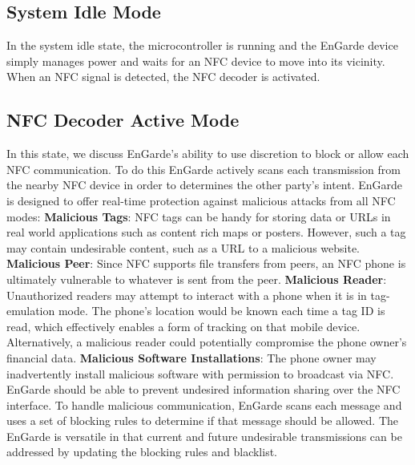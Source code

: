 \documentclass{sig-alternate}
\begin{document}
\subsection{System Idle Mode}
In the system idle state, the microcontroller is running and the EnGarde device simply manages power and waits for an NFC device to move into its vicinity. When an NFC signal is detected, the NFC decoder is activated.

\subsection{NFC Decoder Active Mode}
In this state, we discuss EnGarde's ability to use discretion to block or allow each NFC communication. To do this EnGarde actively scans each transmission from the nearby NFC device in order to determines the other party's intent. EnGarde is designed to offer real-time protection against malicious attacks from all NFC modes:
\vspace{2mm}\newline
\noindent\textbf{Malicious Tags}: NFC tags can be handy for storing data or URLs in real world applications such as content rich maps or posters. However, such a tag may contain undesirable content, such as a URL to a malicious website. 
\vspace{2mm}\newline
\noindent\textbf{Malicious Peer}: Since NFC supports file transfers from peers, an NFC phone is ultimately vulnerable to whatever is sent from the peer.
\vspace{2mm}\newline
\noindent\textbf{Malicious Reader}: Unauthorized readers may attempt to interact with a phone when it is in tag-emulation mode. The phone's location would be known each time a tag ID is read, which effectively enables a form of tracking on that mobile device. Alternatively, a malicious reader could potentially compromise the phone owner's financial data.
\vspace{2mm}\newline
\noindent\textbf{Malicious Software Installations}: The phone owner may inadvertently install malicious software with permission to broadcast via NFC. EnGarde should be able to prevent undesired information sharing over the NFC interface.
\vspace{2mm}\newline
To handle malicious communication, EnGarde scans each message and uses a set of blocking rules to determine if that message should be allowed. The EnGarde is versatile in that current and future undesirable transmissions can be addressed by updating the blocking rules and blacklist.
\end{document}
